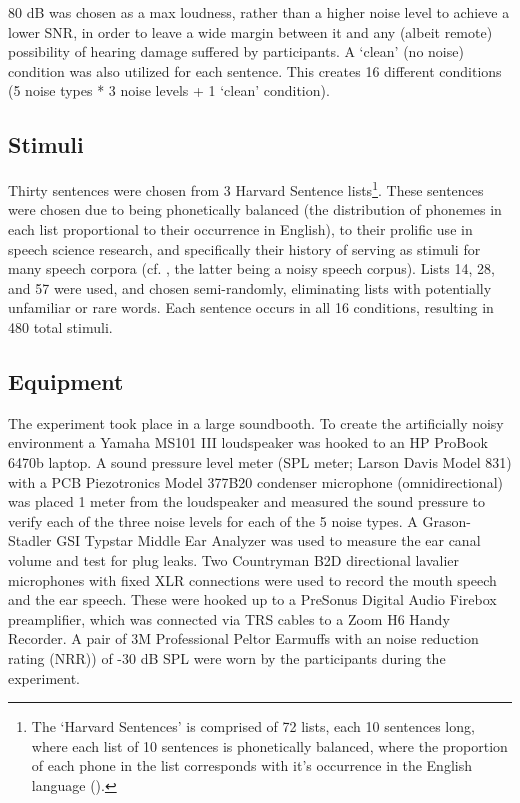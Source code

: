 \documentclass[dissertation,copyright]{uathesis}
\begin{document}
80 dB was chosen as a max loudness, rather than a higher noise level to achieve a lower SNR, in order to leave a wide margin between it and any (albeit remote) possibility of hearing damage suffered by participants.  A `clean' (no noise) condition was also utilized for each sentence.  This creates 16 different conditions (5 noise types * 3 noise levels + 1 `clean' condition).  

\subsection{Stimuli}
Thirty sentences were chosen from 3 Harvard Sentence lists\footnote{The `Harvard Sentences' is comprised of 72 lists, each 10 sentences long, where each list of 10 sentences is phonetically balanced, where the proportion of each phone in the list corresponds with it's occurrence in the English language (\cite{harvardSents}).}.  These sentences were chosen due to being phonetically balanced (the distribution of phonemes in each list proportional to their occurrence in English), to their prolific use in speech science research, and specifically their history of serving as stimuli for many speech corpora (cf. \cite{kabal:02,hu:07}, the latter being a noisy speech corpus).  Lists 14, 28, and 57 were used, and chosen semi-randomly, eliminating lists with potentially unfamiliar or rare words.  Each sentence occurs in all 16 conditions, resulting in 480 total stimuli.

  
\subsection{Equipment}

The experiment took place in a large soundbooth.  To create the artificially noisy environment a Yamaha MS101 III loudspeaker was hooked to an HP ProBook 6470b laptop.  A sound pressure level meter (SPL meter; Larson Davis Model 831) with a PCB Piezotronics Model 377B20 condenser microphone (omnidirectional) was placed 1 meter from the loudspeaker and measured the sound pressure to verify each of the three noise levels for each of the 5 noise types. A Grason-Stadler GSI Typstar Middle Ear Analyzer was used to measure the ear canal volume and test for plug leaks.  Two Countryman B2D directional lavalier microphones with fixed XLR connections were used to record the mouth speech and the ear speech.  These were hooked up to a PreSonus Digital Audio Firebox preamplifier, which was connected via TRS cables to a Zoom H6 Handy Recorder. A pair of 3M Professional Peltor Earmuffs with an noise reduction rating (NRR)) of -30 dB SPL were worn by the participants during the experiment.
\end{document}
